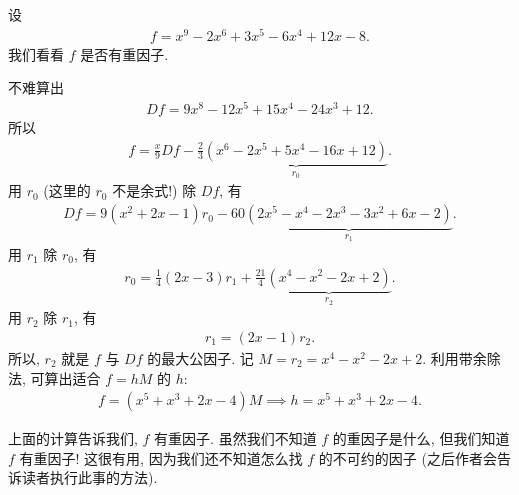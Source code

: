 \begin{example}
    设
    \begin{align*}
        f = x^9-2 x^6+3 x^5-6 x^4+12 x-8.
    \end{align*}
    我们看看 $f$ 是否有重因子.

    不难算出
    \begin{align*}
        Df = 9 x^8-12 x^5+15 x^4-24 x^3+12.
    \end{align*}
    所以
    \begin{align*}
        f = \frac{x}{9} Df - \frac{2}{3} \underbrace{(x^6-2 x^5+5 x^4-16 x+12)}_{r_0}.
    \end{align*}
    用 $r_0$ (这里的 $r_0$ 不是余式!) 除 $Df$, 有
    \begin{align*}
        Df = 9(x^2+2x-1) r_0 - 60 \underbrace{(2 x^5-x^4-2 x^3-3 x^2+6 x-2)}_{r_1}.
    \end{align*}
    用 $r_1$ 除 $r_0$, 有
    \begin{align*}
        r_0 = \frac{1}{4} (2x-3) r_1 + \frac{21}{4} \underbrace{(x^4-x^2-2 x+2)}_{r_2}.
    \end{align*}
    用 $r_2$ 除 $r_1$, 有
    \begin{align*}
        r_1 = (2x-1) r_2.
    \end{align*}
    所以, $r_2$ 就是 $f$ 与 $Df$ 的最大公因子. 记 $M = r_2 = x^4-x^2-2 x+2$. 利用带余除法, 可算出适合 $f = hM$ 的 $h$:
    \begin{align*}
        f = (x^5+x^3+2 x-4) M \implies h = x^5+x^3+2 x-4.
    \end{align*}

    上面的计算告诉我们, $f$ 有重因子. 虽然我们不知道 $f$ 的重因子是什么, 但我们知道 $f$ 有重因子! 这很有用, 因为我们还不知道怎么找 $f$ 的不可约的因子 (之后作者会告诉读者执行此事的方法).


\end{example}
